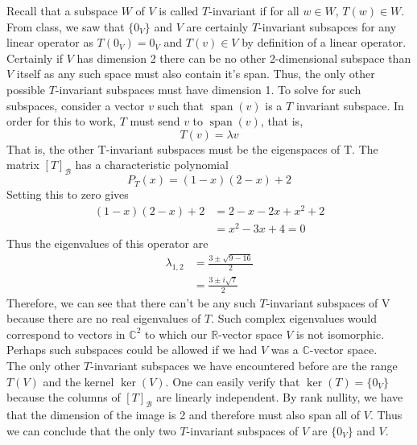 \documentclass[a4paper, 11pt]{article}
\newcommand{\R}{\mathbb{R}}
\newcommand{\C}{\mathbb{C}}
\newenvironment{solution}{%
	\begin{list}{}{%
			\setlength{\topsep}{0pt}%
			\setlength{\leftmargin}{1.5cm}%
			\setlength{\rightmargin}{1.5cm}%
			\setlength{\listparindent}{\parindent}%
			\setlength{\itemindent}{\parindent}%
			\setlength{\parsep}{\parskip}%
		}%
		\item[]}{\end{list}}
\begin{document}
\begin{solution}
  \noindent Recall that a subspace $W$ of $V$ is called $T$-invariant if for all $w\in W$, $T(w)\in W$. From class, we saw that $\{0_V\}$ and $V$ are certainly $T$-invariant subsapces for any linear operator as $T(0_V) = 0_V$ and $T(v)\in V$  by definition of a linear operator. Certainly if $V$ has dimension 2 there can be no other 2-dimensional subspace than $V$ itself as any such space must also contain it's span. Thus, the only other possible $T$-invariant subspaces must have dimension 1. To solve for such subspaces, consider a vector $v$ such that $\operatorname{span}(v)$ is a $T$ invariant subspace. In order for this to work, $T$ must send $v$ to $\operatorname{span}(v)$, that is,
  \begin{equation*}
    T(v) = \lambda v
  \end{equation*}
  That is, the other T-invariant subspaces must be the eigenspaces of T. The matrix $[T]_\mathcal{B}$ has a characteristic polynomial
  \begin{equation*}
    P_T(x) = (1-x)(2-x)+2
  \end{equation*}
  Setting this to zero gives
  \begin{align*}
    (1-x)(2-x)+2 &= 2-x-2x+x^2+2 \\
    &= x^2-3x+4 = 0 
  \end{align*}
  Thus the eigenvalues of this operator are
  \begin{align*}
    \lambda_{1,2} &= \frac{3\pm\sqrt{9-16}}{2} \\
    &= \frac{3\pm i\sqrt{7}}{2}
  \end{align*}
  Therefore, we can see that there can't be any such $T$-invariant subspaces of V because there are no real eigenvalues of $T$. Such complex eigenvalues would correspond to vectors in $\C^2$ to which our $\R$-vector space $V$ is not isomorphic. Perhaps such subspaces could be allowed if we had $V$ was a $\C$-vector space. \\ 


  \noindent The only other $T$-invariant subspaces we have encountered before are the range $T(V)$ and the kernel $\ker(V)$. One can easily verify that $\ker(T) = \{0_V\}$ because the columns of $[T]_\mathcal{B}$ are linearly independent. By rank nullity, we have that the dimension of the image is 2 and therefore must also span all of $V$. Thus we can conclude that the only two $T$-invariant subspaces of $V$ are $\{0_V\}$ and $V$. \\
\end{solution}
\end{document}
